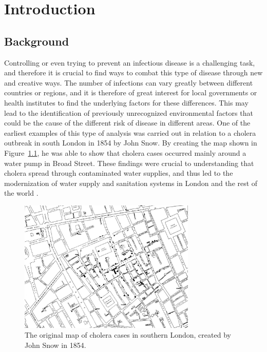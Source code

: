 %
\chapter{Introduction}
\label{sec:intro}
\section{Background}
Controlling or even trying to prevent an infectious disease is a challenging task, and therefore it is crucial to find ways to combat this type of disease through new and creative ways. The number of infections can vary greatly between different countries or regions, and it is therefore of great interest for local governments or health institutes to find the underlying factors for these differences. This may lead to the identification of previously unrecognized environmental factors that could be the cause of the different risk of disease in different areas. One of the earliest examples of this type of analysis was carried out in relation to a cholera outbreak in south London in 1854 by John Snow. By creating the map shown in Figure~\ref{cholera}, he was able to show that cholera cases occurred mainly around a water pump in Broad Street. These findings were crucial to understanding that cholera spread through contaminated water supplies, and thus led to the modernization of water supply and sanitation systems in London and the rest of the world \autocite[][]{snow1857cholera}.
\begin{figure}[H]
    \centering
    \includegraphics[width = 0.75\textwidth]{cholera_map.jpg}
    \caption{The original map of cholera cases in southern London, created by John Snow in 1854.}
    \label{cholera}
\end{figure}
